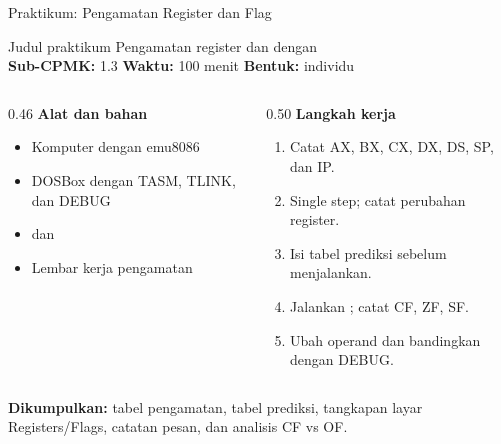 \documentclass[aspectratio=169,11pt]{beamer}
\begin{document}
\begin{frame}{Praktikum: Pengamatan Register dan Flag}
\begin{block}{Judul praktikum}
\small Pengamatan register dan  dengan \\[0.15em]
\textbf{Sub-CPMK:} 1.3 \quad\textbullet\quad
\textbf{Waktu:} 100 menit \quad\textbullet\quad
\textbf{Bentuk:} individu
\end{block}

\vspace{0.2em}
\begin{columns}[t]
\begin{column}{0.46\textwidth}
{\color{obeBlue}\bfseries Alat dan bahan}
\begin{itemize}\footnotesize
    \item Komputer dengan emu8086
    \item DOSBox dengan TASM, TLINK, dan DEBUG
    \item {} dan 
    \item Lembar kerja pengamatan
\end{itemize}
\end{column}
\begin{column}{0.50\textwidth}
{\color{obeBlue}\bfseries Langkah kerja}
\begin{enumerate}\footnotesize
    \item Catat AX, BX, CX, DX, DS, SP, dan IP.
    \item Single step; catat perubahan register.
    \item Isi tabel prediksi sebelum menjalankan.
    \item Jalankan ; catat CF, ZF, SF.
    \item Ubah operand dan bandingkan dengan DEBUG.
\end{enumerate}
\end{column}
\end{columns}

\vspace{0.2em}
{\footnotesize\textbf{Dikumpulkan:} tabel pengamatan, tabel
prediksi, tangkapan layar Registers/Flags, catatan pesan, dan
analisis CF vs OF.\par}
\end{frame}
\end{document}
